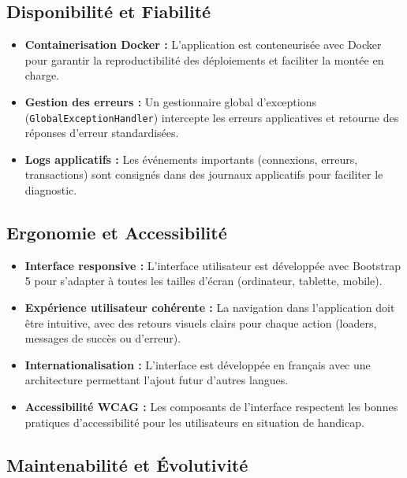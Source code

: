 \documentclass[a4paper,12pt]{report}
\begin{document}
\subsection{Disponibilité et Fiabilité}

\begin{itemize}
    \item \textbf{Containerisation Docker :} L'application est conteneurisée avec Docker pour garantir la reproductibilité des déploiements et faciliter la montée en charge.
    \item \textbf{Gestion des erreurs :} Un gestionnaire global d'exceptions (\texttt{GlobalExceptionHandler}) intercepte les erreurs applicatives et retourne des réponses d'erreur standardisées.
    \item \textbf{Logs applicatifs :} Les événements importants (connexions, erreurs, transactions) sont consignés dans des journaux applicatifs pour faciliter le diagnostic.
\end{itemize}

\subsection{Ergonomie et Accessibilité}

\begin{itemize}
    \item \textbf{Interface responsive :} L'interface utilisateur est développée avec Bootstrap 5 pour s'adapter à toutes les tailles d'écran (ordinateur, tablette, mobile).
    \item \textbf{Expérience utilisateur cohérente :} La navigation dans l'application doit être intuitive, avec des retours visuels clairs pour chaque action (loaders, messages de succès ou d'erreur).
    \item \textbf{Internationalisation :} L'interface est développée en français avec une architecture permettant l'ajout futur d'autres langues.
    \item \textbf{Accessibilité WCAG :} Les composants de l'interface respectent les bonnes pratiques d'accessibilité pour les utilisateurs en situation de handicap.
\end{itemize}

\subsection{Maintenabilité et Évolutivité}
\end{document}
